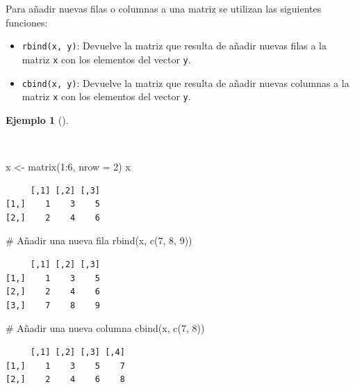 \documentclass[
  spanish,
  a4paper,
]{scrreport}
\newenvironment{Shaded}{\begin{snugshade}}{\end{snugshade}}
\newcommand{\AttributeTok}[1]{\textcolor[rgb]{0.40,0.45,0.13}{#1}}
\newcommand{\CommentTok}[1]{\textcolor[rgb]{0.37,0.37,0.37}{#1}}
\newcommand{\DecValTok}[1]{\textcolor[rgb]{0.68,0.00,0.00}{#1}}
\newcommand{\FunctionTok}[1]{\textcolor[rgb]{0.28,0.35,0.67}{#1}}
\newcommand{\NormalTok}[1]{\textcolor[rgb]{0.00,0.23,0.31}{#1}}
\newcommand{\OtherTok}[1]{\textcolor[rgb]{0.00,0.23,0.31}{#1}}
\newcommand{\SpecialCharTok}[1]{\textcolor[rgb]{0.37,0.37,0.37}{#1}}
\providecommand{\tightlist}{%
  \setlength{\itemsep}{0pt}\setlength{\parskip}{0pt}}
\theoremstyle{definition}
\theoremstyle{definition}
\newtheorem{example}{Ejemplo}[chapter]
\theoremstyle{remark}
\begin{document}
Para añadir nuevas filas o columnas a una matriz se utilizan las
siguientes funciones:

\begin{itemize}
\tightlist
\item
  \texttt{rbind(x,\ y)}: Devuelve la matriz que resulta de añadir nuevas
  filas a la matriz \texttt{x} con los elementos del vector \texttt{y}.
\item
  \texttt{cbind(x,\ y)}: Devuelve la matriz que resulta de añadir nuevas
  columnas a la matriz \texttt{x} con los elementos del vector
  \texttt{y}.
\end{itemize}

\begin{example}[]\protect\hypertarget{exm-añadir-filas-columnas-matriz}{}\label{exm-añadir-filas-columnas-matriz}

~

\begin{Shaded}
\begin{Highlighting}[]
\NormalTok{x }\OtherTok{\textless{}{-}} \FunctionTok{matrix}\NormalTok{(}\DecValTok{1}\SpecialCharTok{:}\DecValTok{6}\NormalTok{, }\AttributeTok{nrow =} \DecValTok{2}\NormalTok{)}
\NormalTok{x}
\end{Highlighting}
\end{Shaded}

\begin{verbatim}
     [,1] [,2] [,3]
[1,]    1    3    5
[2,]    2    4    6
\end{verbatim}

\begin{Shaded}
\begin{Highlighting}[]
\CommentTok{\# Añadir una nueva fila}
\FunctionTok{rbind}\NormalTok{(x, }\FunctionTok{c}\NormalTok{(}\DecValTok{7}\NormalTok{, }\DecValTok{8}\NormalTok{, }\DecValTok{9}\NormalTok{))}
\end{Highlighting}
\end{Shaded}

\begin{verbatim}
     [,1] [,2] [,3]
[1,]    1    3    5
[2,]    2    4    6
[3,]    7    8    9
\end{verbatim}

\begin{Shaded}
\begin{Highlighting}[]
\CommentTok{\# Añadir una nueva columna}
\FunctionTok{cbind}\NormalTok{(x, }\FunctionTok{c}\NormalTok{(}\DecValTok{7}\NormalTok{, }\DecValTok{8}\NormalTok{))}
\end{Highlighting}
\end{Shaded}

\begin{verbatim}
     [,1] [,2] [,3] [,4]
[1,]    1    3    5    7
[2,]    2    4    6    8
\end{verbatim}

\end{example}
\end{document}
